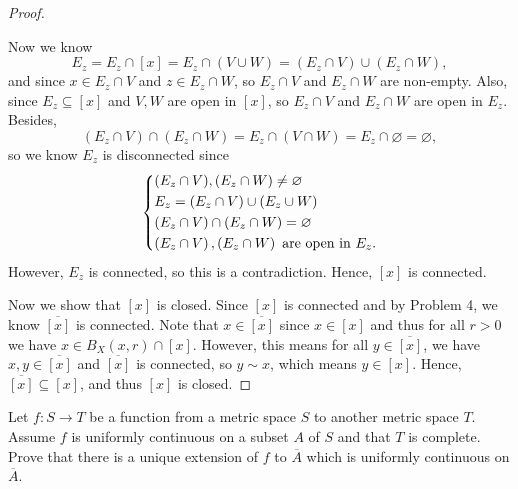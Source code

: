 \begin{proof}
\begin{explanation}
    \end{explanation}    
    Now we know 
    \[
        E_z = E_z \cap [x] = E_z \cap (V \cup W) = (E_z \cap V) \cup (E_z \cap W),
    \] and since \(x \in E_z \cap V\) and \(z \in E_z \cap W\), so \(E_z \cap V\) and \(E_z \cap W\) are non-empty. Also, since \(E_z \subseteq [x]\) and \(V, W\) are open in \([x]\), so \(E_z \cap V\) and \(E_z \cap W\) are open in \(E_z\). Besides, 
    \[
        (E_z \cap V) \cap (E_z \cap W) = E_z \cap (V \cap W) = E_z \cap \varnothing = \varnothing,
    \] so we know \(E_z\) is disconnected since 
    \[
        \begin{dcases}
            (E_z \cap V), (E_z \cap W) \neq \varnothing \\
            E_z = (E_z \cap V ) \cup (E_z \cup W) \\
            (E_z \cap V) \cap (E_z \cap W) = \varnothing \\
            \left( E_z \cap V \right), \left( E_z \cap W \right) \text{ are open in } E_z.  
        \end{dcases}
    \] 
    However, \(E_z\) is connected, so this is a contradiction. Hence, \([x]\) is connected. 
    
    Now we show that \([x]\) is closed. Since \([x]\) is connected and by Problem 4, we know \(\overline{[x]} \) is connected. Note that \(x \in \overline{[x]} \) since \(x \in [x]\) and thus for all \(r > 0\) we have \(x \in B_X(x, r) \cap [x]\). However, this means for all \(y \in \overline{[x]} \), we have \(x, y \in \overline{[x]} \) and \(\overline{[x]} \) is connected, so \(y \sim x\), which means \(y \in [x]\). Hence, \(\overline{[x]} \subseteq [x]\), and thus \([x]\) is closed.             
\end{proof}
\begin{problem}[15pts]
    Let $f : S \to T$ be a function from a metric space $S$ to another metric space $T$.  
Assume $f$ is uniformly continuous on a subset $A$ of $S$ and that $T$ is complete.  
Prove that there is a unique extension of $f$ to $\overline{A}$ which is uniformly continuous on $\overline{A}$.
\end{problem}

